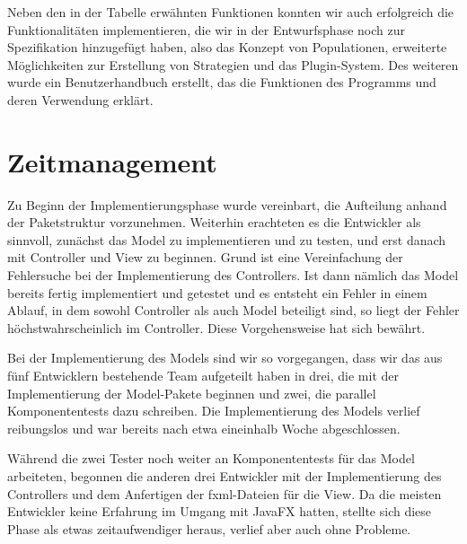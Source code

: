 \documentclass[parskip=full,11pt]{scrartcl}
\begin{document}
Neben den in der Tabelle erwähnten Funktionen konnten wir auch erfolgreich die Funktionalitäten implementieren, die wir in der Entwurfsphase noch zur Spezifikation hinzugefügt haben, also das Konzept von Populationen, erweiterte Möglichkeiten zur Erstellung von Strategien und das Plugin-System. Des weiteren wurde ein Benutzerhandbuch erstellt, das die Funktionen des Programms und deren Verwendung erklärt.

\section{Zeitmanagement}
Zu Beginn der Implementierungsphase wurde vereinbart, die Aufteilung anhand der Paketstruktur vorzunehmen. Weiterhin erachteten es die Entwickler als sinnvoll, zunächst das Model zu implementieren und zu testen, und erst danach mit Controller und View zu beginnen. Grund ist eine Vereinfachung der Fehlersuche bei der Implementierung des Controllers. Ist dann nämlich das Model bereits fertig implementiert und getestet und es entsteht ein Fehler in einem Ablauf, in dem sowohl Controller als auch Model beteiligt sind, so liegt der Fehler höchstwahrscheinlich im Controller. Diese Vorgehensweise hat sich bewährt.

Bei der Implementierung des Models sind wir so vorgegangen, dass wir das aus fünf Entwicklern bestehende Team aufgeteilt haben in drei, die mit der Implementierung der Model-Pakete beginnen und zwei, die parallel Komponententests dazu schreiben. Die Implementierung des Models verlief reibungslos und war bereits nach etwa eineinhalb Woche abgeschlossen.

Während die zwei Tester noch weiter an Komponententests für das Model arbeiteten, begonnen die anderen drei Entwickler mit der Implementierung des Controllers und dem Anfertigen der fxml-Dateien für die View. Da die meisten Entwickler keine Erfahrung im Umgang mit JavaFX hatten, stellte sich diese Phase als etwas zeitaufwendiger heraus, verlief aber auch ohne Probleme.
\end{document}
